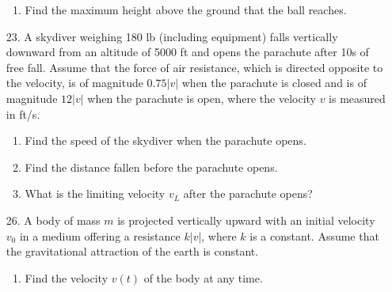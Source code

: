 \documentclass[9pt]{article}
\begin{document}
\begin{enumerate}
               \begin{enumerate}
                  \item Find the maximum height above the ground that the ball
                        reaches.
               \end{enumerate}
   \item[23.]  A skydiver weighing 180 lb (including equipment) falls vertically
               downward from an altitude of 5000 ft and opens the parachute
               after 10s of free fall. Assume that the force of air resistance,
               which is directed opposite to the velocity, is of magnitude
               $0.75|v|$ when the parachute is closed and is of magnitude
               $12|v|$ when the parachute is open, where the velocity $v$ is
               measured in ft/s.

               \begin{enumerate}
                  \item Find the speed of the skydiver when the parachute opens.
                  \item Find the distance fallen before the parachute opens.
                  \item What is the limiting velocity $v_L$ after the parachute
                        opens?
               \end{enumerate}
   \item[26.]  A body of mass $m$ is projected vertically upward with an initial
               velocity $v_0$ in a medium offering a resistance $k|v|$, where
               $k$ is a constant. Assume that the gravitational attraction of
               the earth is constant.

               \begin{enumerate}
                  \item Find the velocity $v(t)$ of the body at any time.
               \end{enumerate}
      
\end{enumerate}
\end{document}
